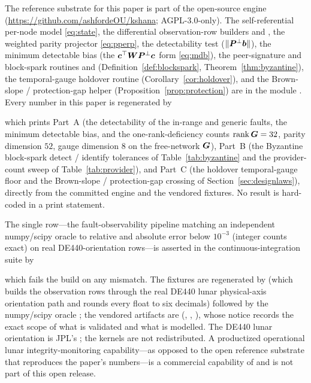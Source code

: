 \label{sec:availability}
The reference substrate for this paper is part of the open-source  engine
\citep{baweja2026kshana} (\url{https://github.com/ashfordeOU/kshana}; AGPL-3.0-only). The
self-referential per-node model \eqref{eq:state}, the differential observation-row builders
 and , the weighted parity
projector  \eqref{eq:pperp}, the detectability test
 ($\lVert\bm{P}^{\perp}\bm{b}\rVert$), the minimum detectable bias 
(the $\bm c^\top\bm{W}\bm{P}^{\perp}\bm c$ form \eqref{eq:mdb}), the peer-signature and block-spark
routines  and 
(Definition~\ref{def:blockspark}, Theorem~\ref{thm:byzantine}), the temporal-gauge holdover
routine  (Corollary~\ref{cor:holdover}), and the Brown-slope /
protection-gap helper (Proposition~\ref{prop:protection}) are in the module
. Every number in this paper is regenerated by
\begin{quote}
\end{quote}
which prints Part~A (the detectability of the in-range and generic faults, the minimum
detectable bias, and the one-rank-deficiency counts $\operatorname{rank}\bm{G}=32$, parity dimension $52$,
gauge dimension $8$ on the free-network $\bm{G}$), Part~B (the Byzantine block-spark detect /
identify tolerances of Table~\ref{tab:byzantine} and the provider-count sweep of
Table~\ref{tab:provider}), and Part~C (the holdover temporal-gauge floor and the Brown-slope
/ protection-gap crossing of Section~\ref{sec:designlaws}), directly from the committed engine
and the vendored fixtures. No result is hard-coded in a print statement.

The single \Validated{} row---the fault-observability pipeline matching an independent
numpy/scipy oracle to relative and absolute error below $10^{-3}$ (integer counts exact) on
real DE440-orientation rows---is asserted in the continuous-integration suite by
\begin{quote}
\end{quote}
which fails the build on any mismatch. The fixtures are regenerated by
 (which builds the observation rows through the
real DE440 lunar physical-axis orientation path and rounds every float to six decimals)
followed by the numpy/scipy oracle ; the vendored
artifacts are  (, ,
), whose notice records the exact scope of what is validated and what is
modelled. The DE440 lunar orientation is JPL's \citep{park2021de440}; the kernels are not
redistributed. A productized operational lunar integrity-monitoring capability---as opposed to
the open reference substrate that reproduces the paper's numbers---is a commercial capability
of  and is not part of this open release.
